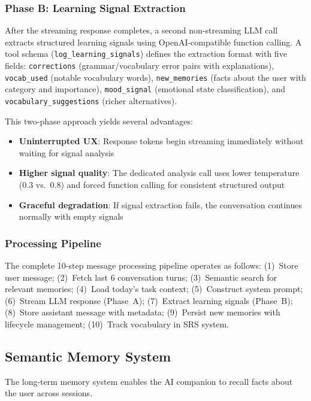 \documentclass[conference]{IEEEtran}
\begin{document}
\subsubsection{Phase B: Learning Signal Extraction}

After the streaming response completes, a second non-streaming LLM call extracts structured learning signals using OpenAI-compatible function calling. A tool schema (\texttt{log\_learning\_signals}) defines the extraction format with five fields: \texttt{corrections} (grammar/vocabulary error pairs with explanations), \texttt{vocab\_used} (notable vocabulary words), \texttt{new\_memories} (facts about the user with category and importance), \texttt{mood\_signal} (emotional state classification), and \texttt{vocabulary\_suggestions} (richer alternatives).

This two-phase approach yields several advantages:
\begin{itemize}[leftmargin=*]
    \item \textbf{Uninterrupted UX}: Response tokens begin streaming immediately without waiting for signal analysis
    \item \textbf{Higher signal quality}: The dedicated analysis call uses lower temperature (0.3 vs.\ 0.8) and forced function calling for consistent structured output
    \item \textbf{Graceful degradation}: If signal extraction fails, the conversation continues normally with empty signals
\end{itemize}

\subsubsection{Processing Pipeline}

The complete 10-step message processing pipeline operates as follows: (1)~Store user message; (2)~Fetch last 6 conversation turns; (3)~Semantic search for relevant memories; (4)~Load today's task context; (5)~Construct system prompt; (6)~Stream LLM response (Phase~A); (7)~Extract learning signals (Phase~B); (8)~Store assistant message with metadata; (9)~Persist new memories with lifecycle management; (10)~Track vocabulary in SRS system.

\subsection{Semantic Memory System}

The long-term memory system enables the AI companion to recall facts about the user across sessions.
\end{document}
